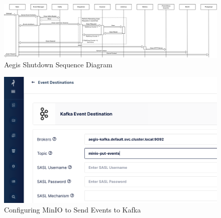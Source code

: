 \documentclass[12pt, conference, final, a4paper, onecolumn, compsoc]{IEEEtran}
\begin{document}
\begin{figure}[H]
  \centering \includegraphics[scale=0.31]{diagrams/shutdown-sequence.png}
  \caption{Aegis Shutdown Sequence Diagram}
  \label{appendix:shutdown-sequence}
\end{figure}











\begin{figure}[H]
  \centering \includegraphics[scale=0.31]{images/minio-event-queue.png}
  \caption{Configuring MinIO to Send Events to Kafka}
  \label{appendix:minio-event-queue}
\end{figure}
\end{document}

